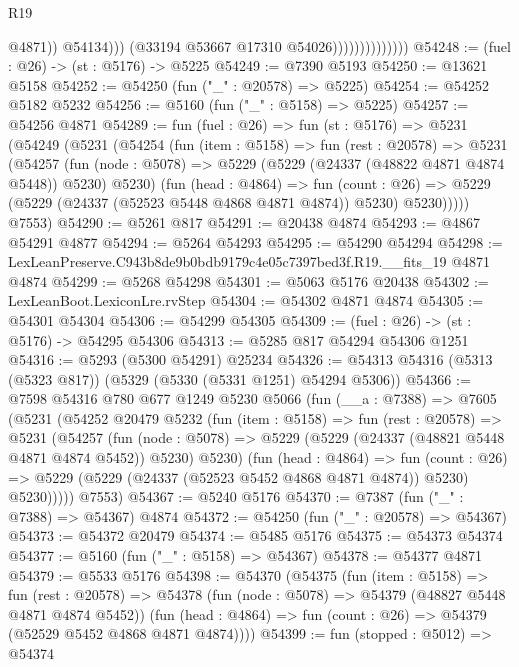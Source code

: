 \begin{lexlean}{R19}
\begin{coremodule}
                                        @4871))
                                    @54134)))
                              (@33194 @53667 @17310 @54026))))))))))))))
@54248 := (fuel : @26) -> (st : @5176) -> @5225
@54249 := @7390 @5193
@54250 := @13621 @5158
@54252 := @54250 (fun ("_" : @20578) => @5225)
@54254 := @54252 @5182 @5232
@54256 := @5160 (fun ("_" : @5158) => @5225)
@54257 := @54256 @4871
@54289 := fun (fuel : @26) =>
  fun (st : @5176) =>
  @5231
    (@54249
      (@5231
        (@54254
          (fun (item : @5158) =>
          fun (rest : @20578) =>
          @5231
            (@54257
              (fun (node : @5078) => @5229 (@5229 (@24337 (@48822 @4871 @4874 @5448)) @5230) @5230)
              (fun (head : @4864) =>
              fun (count : @26) =>
              @5229 (@5229 (@24337 (@52523 @5448 @4868 @4871 @4874)) @5230) @5230)))))
      @7553)
@54290 := @5261 @817
@54291 := @20438 @4874
@54293 := @4867 @54291 @4877
@54294 := @5264 @54293
@54295 := @54290 @54294
@54298 := LexLeanPreserve.C943b8de9b0bdb9179c4e05c7397bed3f.R19.__fits_19 @4871 @4874
@54299 := @5268 @54298
@54301 := @5063 @5176 @20438
@54302 := LexLeanBoot.LexiconLre.rvStep
@54304 := @54302 @4871 @4874
@54305 := @54301 @54304
@54306 := @54299 @54305
@54309 := (fuel : @26) -> (st : @5176) -> @54295 @54306
@54313 := @5285 @817 @54294 @54306 @1251
@54316 := @5293 (@5300 @54291) @25234
@54326 := @54313 @54316 (@5313 (@5323 @817)) (@5329 (@5330 (@5331 @1251) @54294 @5306))
@54366 := @7598
    @54316
    @780
    @677
    @1249
    @5230
    @5066
    (fun (__a : @7388) =>
    @7605
      (@5231
        (@54252
          @20479
          @5232
          (fun (item : @5158) =>
          fun (rest : @20578) =>
          @5231
            (@54257
              (fun (node : @5078) =>
              @5229 (@5229 (@24337 (@48821 @5448 @4871 @4874 @5452)) @5230) @5230)
              (fun (head : @4864) =>
              fun (count : @26) =>
              @5229 (@5229 (@24337 (@52523 @5452 @4868 @4871 @4874)) @5230) @5230)))))
      @7553)
@54367 := @5240 @5176
@54370 := @7387 (fun ("_" : @7388) => @54367) @4874
@54372 := @54250 (fun ("_" : @20578) => @54367)
@54373 := @54372 @20479
@54374 := @5485 @5176
@54375 := @54373 @54374
@54377 := @5160 (fun ("_" : @5158) => @54367)
@54378 := @54377 @4871
@54379 := @5533 @5176
@54398 := @54370
    (@54375
      (fun (item : @5158) =>
      fun (rest : @20578) =>
      @54378
        (fun (node : @5078) => @54379 (@48827 @5448 @4871 @4874 @5452))
        (fun (head : @4864) => fun (count : @26) => @54379 (@52529 @5452 @4868 @4871 @4874))))
@54399 := fun (stopped : @5012) => @54374

\end{coremodule}
\end{lexlean}
